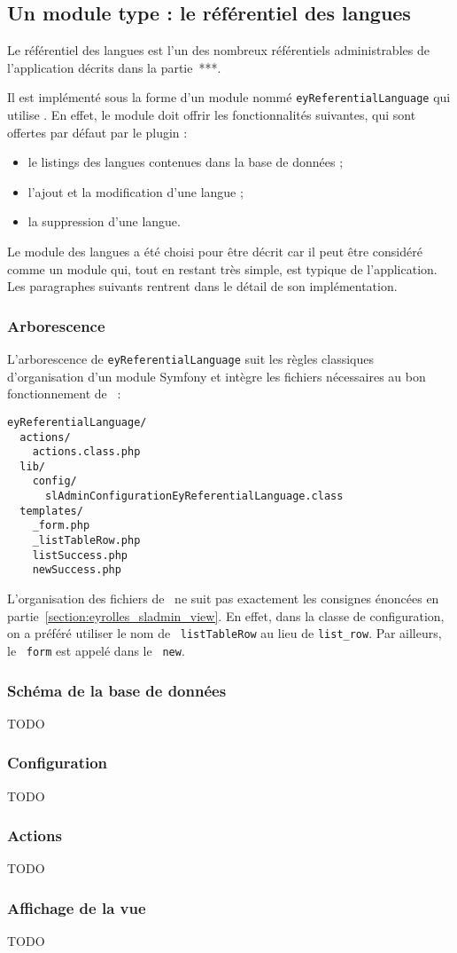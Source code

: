 \subsection{Un module type : le référentiel des langues}
\label{section:eyrolles_ref-langues}

Le référentiel des langues est l'un des nombreux référentiels administrables de l'application décrits dans la partie~***.

Il est implémenté sous la forme d'un module nommé \texttt{eyReferentialLanguage} qui utilise \asladmin. En effet, le module doit offrir les fonctionnalités suivantes, qui sont offertes par défaut par le plugin :
\begin{itemize}
\item le listings des langues contenues dans la base de données ;
\item l'ajout et la modification d'une langue ;
\item la suppression d'une langue.
\end{itemize}

Le module des langues a été choisi pour être décrit car il peut être considéré comme un module qui, tout en restant très simple, est typique de l'application. Les paragraphes suivants rentrent dans le détail de son implémentation.


\subsubsection{Arborescence}

L'arborescence de \texttt{eyReferentialLanguage} suit les règles classiques d'organisation d'un module Symfony et intègre les fichiers nécessaires au bon fonctionnement de \asladmin\ :

\begin{verbatim}
eyReferentialLanguage/
  actions/
    actions.class.php
  lib/
    config/
      slAdminConfigurationEyReferentialLanguage.class
  templates/
    _form.php
    _listTableRow.php
    listSuccess.php
    newSuccess.php
\end{verbatim}

L'organisation des fichiers de \atemplate\ ne suit pas exactement les consignes énoncées en partie~\ref{section:eyrolles_sladmin_view}. En effet, dans la classe de configuration, on a préféré utiliser le nom de \apartial\ \texttt{listTableRow} au lieu de \texttt{list\_row}. Par ailleurs, le \apartial\ \texttt{form} est appelé dans le \atemplate\ \texttt{new}.


\subsubsection{Schéma de la base de données}

TODO


\subsubsection{Configuration}

TODO


\subsubsection{Actions}

TODO


\subsubsection{Affichage de la vue}

TODO
